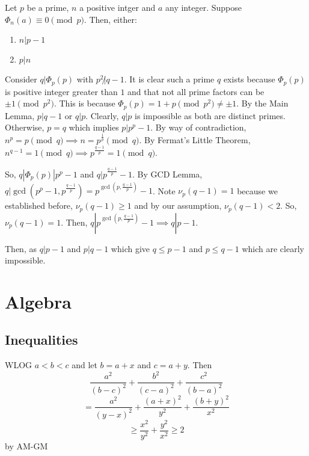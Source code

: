 \documentclass[11pt]{article}
\begin{document}

\begin{sol}
\begin{lemma}[Lemma 1]
Let $p$ be a prime, $n$ a positive intger and $a$ any integer. Suppose $\Phi_{n}(a)\equiv 0\pmod{p}$. Then, either:
\begin{enumerate}
\item $n|p-1$
\item $p|n$
\end{enumerate}
\end{lemma}

Consider $q|\Phi_{p}(p)$ with $p^2\not | q-1$.  It is clear such a prime $q$ exists because $\Phi_{p}(p)$ is positive integer greater than $1$ and that not all prime factors can be $\pm 1\pmod{p^2}$. This is because $\Phi_{p}(p)=1+p\pmod{p^2}\neq \pm 1$. By the Main Lemma, $p|q-1$ or $q|p$. Clearly, $q|p$ is impossible as both are distinct primes. Otherwise, $p=q$ which implies $p|p^{p}-1$. By way of contradiction, $n^{p}=p\pmod{q}\implies n = p^{\frac{1}{p}} \pmod{q}$. By Fermat's Little Theorem, $n^{q-1}=1\pmod{q}\implies p^{\frac{q-1}{p}}=1\pmod{q}$.

So, $q|\Phi_{p}(p)|p^{p}-1$ and $q|p^{\frac{q-1}{p}}-1$. By GCD Lemma, $q|\gcd(p^p-1, p^{\frac{q-1}{p}}) = p^{\gcd(p, \frac{q-1}{p})}-1$.  Note $\nu_{p}(q-1)=1$ because we established before, $\nu_{p}(q-1)\ge 1$ and by our assumption, $\nu_{p}(q-1)<2$. So, $\nu_{p}(q-1)=1$. Then, $q|p^{\gcd(p,\frac{q-1}{p})}-1\implies q|p-1$.

Then, as $q|p-1$ and $p|q-1$ which give $q\leq p-1$ and $p\leq q-1$ which are clearly impossible.
\end{sol}

\setcounter{problem}{0}
\section{Algebra}

\subsection{Inequalities}

\begin{sol} WLOG $a<b<c$ and let $b=a+x$ and $c=a+y$. Then
$$\frac{a^2}{(b-c)^2}+\frac{b^2}{(c-a)^2}+\frac{c^2}{(b-a)^2}$$
$$=\frac{a^2}{(y-x)^2} + \frac{(a+x)^2}{y^2}+\frac{(b+y)^2}{x^2}$$
$$\ge \frac{x^2}{y^2}+\frac{y^2}{x^2}\ge 2$$
by AM-GM
\end{sol}
\end{document}
